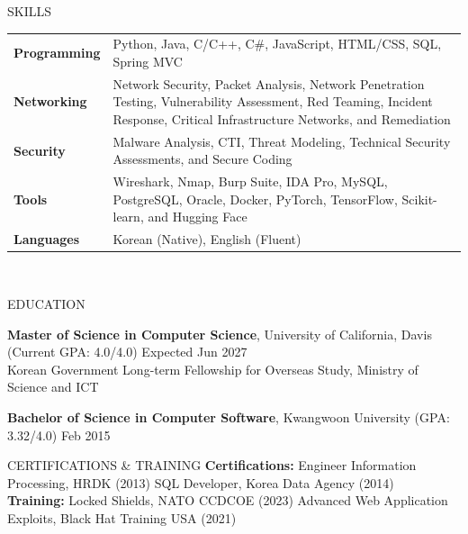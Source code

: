 \documentclass{resume}
\begin{document}
\begin{rSection}{SKILLS}
\begin{tabular}{ @{} >{\bfseries}l @{\hspace{2ex}} p{} }
Programming & Python, Java, C/C++, C\#, JavaScript, HTML/CSS, SQL, Spring MVC \\
Networking & Network Security, Packet Analysis, Network Penetration Testing, Vulnerability Assessment, Red Teaming, Incident Response, Critical Infrastructure Networks, and Remediation \\
Security & Malware Analysis, CTI, Threat Modeling, Technical Security Assessments, and Secure Coding \\
Tools & Wireshark, Nmap, Burp Suite, IDA Pro, MySQL, PostgreSQL, Oracle, Docker, PyTorch, TensorFlow, Scikit-learn, and Hugging Face \\
Languages & Korean (Native), English (Fluent) \\
\end{tabular}\\
\end{rSection}

\begin{rSection}{EDUCATION}

{\bf Master of Science in Computer Science}, University of California, Davis (Current GPA: 4.0/4.0) \hfill {Expected Jun 2027}\\
Korean Government Long-term Fellowship for Overseas Study, Ministry of Science and ICT

{\bf Bachelor of Science in Computer Software}, Kwangwoon University (GPA: 3.32/4.0) \hfill {Feb 2015}

\end{rSection}

\begin{rSection}{CERTIFICATIONS \& TRAINING}
\textbf{Certifications:} Engineer Information Processing, HRDK (2013) \quad SQL Developer, Korea Data Agency (2014) \\
\textbf{Training:} Locked Shields, NATO CCDCOE (2023) \quad Advanced Web Application Exploits, Black Hat Training USA (2021)
\end{rSection}
\end{document}

